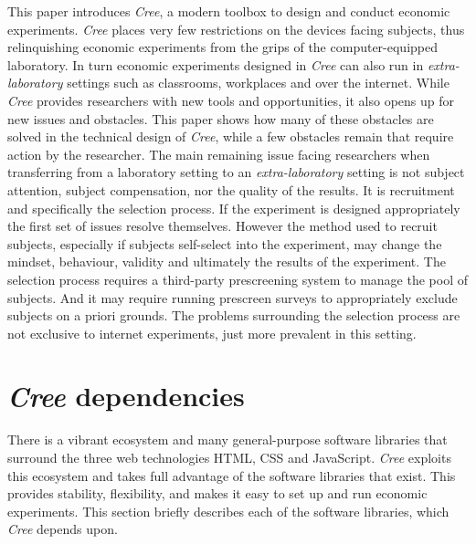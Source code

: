 \documentclass[preprint, 12pt]{elsarticle}
\newcommand{\Cree}{\emph{Cree}\xspace}
\begin{document}
This paper introduces \Cree, a modern toolbox to design and conduct economic experiments. \Cree places very few restrictions on the devices facing subjects, thus relinquishing economic experiments from the grips of the computer-equipped laboratory. In turn economic experiments designed in \Cree can also run in \emph{extra-laboratory} settings such as classrooms, workplaces and over the internet. While \Cree provides researchers with new tools and opportunities, it also opens up for new issues and obstacles. This paper shows how many of these obstacles are solved in the technical design of \Cree, while a few obstacles remain that require action by the researcher. The main remaining issue facing researchers when transferring from a laboratory setting to an \emph{extra-laboratory} setting is not subject attention, subject compensation, nor the quality of the results. It is recruitment and specifically the selection process. If the experiment is designed appropriately the first set of issues resolve themselves. However the method used to recruit subjects, especially if subjects self-select into the experiment, may change the mindset, behaviour, validity and ultimately the results of the experiment. The selection process requires a third-party prescreening system to manage the pool of subjects. And it may require running prescreen surveys to appropriately exclude subjects on a priori grounds. The problems surrounding the selection process are not exclusive to internet experiments, just more prevalent in this setting.

\newpage

\appendix

\section{\Cree dependencies}

There is a vibrant ecosystem and many general-purpose software libraries that surround the three web technologies HTML, CSS and JavaScript. \Cree exploits this ecosystem and takes full advantage of the software libraries that exist. This provides stability, flexibility, and makes it easy to set up and run economic experiments. This section briefly describes each of the software libraries, which \Cree depends upon.
\end{document}
